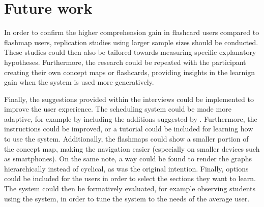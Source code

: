 \section{Future work}

In order to confirm the higher comprehension gain in flashcard users compared to flashmap users, replication studies using larger sample sizes should be conducted. These studies could then also be tailored towards measuring specific explanatory hypotheses. Furthermore, the research could be repeated with the participant creating their own concept maps or flashcards, providing insights in the learnign gain when the system is used more generatively.

Finally, the suggestions provided within the interviews could be implemented to improve the user experience. The scheduling system could be made more adaptive, for example by including the additions suggested by . Furthermore, the instructions could be improved, or a tutorial could be included for learning how to use the system. Additionally, the flashmaps could show a smaller portion of the concept map, making the navigation easier (especially on smaller devices such as smartphones). On the same note, a way could be found to render the graphs hierarchically instead of cyclical, as was the original intention. Finally, options could be included for the users in order to select the sections they want to learn. The system could then be formatively evaluated, for example observing students using the system, in order to tune the system to the needs of the average user.
